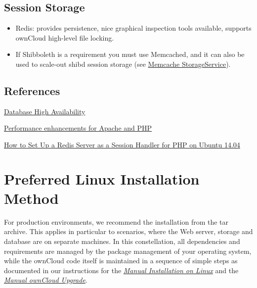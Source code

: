 \documentclass[letterpaper,10pt,english]{sphinxmanual}
\begin{document}
\subsection{Session Storage}
\label{installation/deployment_recommendations:session-storage}\begin{itemize}
\item {} 
Redis: provides persistence, nice graphical inspection tools available,
supports ownCloud high-level file locking.

\item {} 
If Shibboleth is a requirement you must use Memcached, and it can also be
used to scale-out shibd session storage (see \href{https://wiki.shibboleth.net/confluence/display/SHIB2/NativeSPStorageService\#NativeSPStorageService-MemcacheStorageService}{Memcache StorageService}).

\end{itemize}


\subsection{References}
\label{installation/deployment_recommendations:references}
\href{http://www.severalnines.com/blog/become-mysql-dba-blog-series-database-high-availability}{Database High Availability}

\href{http://blog.bitnami.com/2014/06/performance-enhacements-for-apache-and.html}{Performance enhancements for Apache and PHP}

\href{https://www.digitalocean.com/community/tutorials/how-to-set-up-a-redis-server-as-a-session-handler-for-php-on-ubuntu-14-04}{How to Set Up a Redis Server as a Session Handler for PHP on Ubuntu 14.04}


\section{Preferred Linux Installation Method}
\label{installation/linux_installation:preferred-linux-installation-method}\label{installation/linux_installation:haproxy-documentation}\label{installation/linux_installation::doc}
For production environments, we recommend the installation from the tar archive.
This applies in particular to scenarios, where the Web server, storage and database are on separate machines.
In this constellation, all dependencies and requirements are managed by the package management
of your operating system, while the ownCloud code itself is maintained in a sequence of simple steps
as documented in our instructions for the {\hyperref[installation/source_installation::doc]{\emph{Manual Installation on Linux}}} and the {\hyperref[maintenance/manual_upgrade::doc]{\emph{Manual ownCloud Upgrade}}}.
\end{document}
